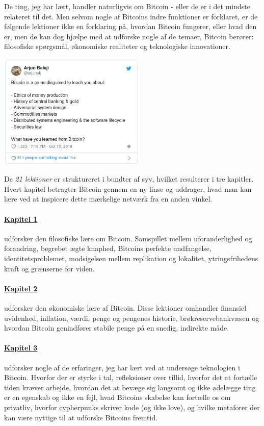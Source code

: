 \documentclass[paper=6in:9in,pagesize=pdftex,headinclude=on,footinclude=on,12pt]{scrbook}
\begin{document}
De ting, jeg har lært, handler naturligvis om Bitcoin - eller de er i det mindste relateret til det. Men selvom nogle af Bitcoins indre funktioner er forklaret, er de følgende lektioner ikke en forklaring på, hvordan Bitcoin fungerer, eller hvad den er, men de kan dog hjælpe med at udforske nogle af de temaer, Bitcoin berører: filosofiske spørgsmål, økonomiske realiteter og teknologiske innovationer.\begin{center}
  \includegraphics[width=7cm]{assets/images/the-tweet.png}
\end{center}

De \textit{21 lektioner} er struktureret i bundter af syv, hvilket resulterer i tre kapitler. Hvert kapitel betragter Bitcoin gennem en ny linse og uddrager, hvad man kan lære ved at inspicere dette mærkelige netværk fra en anden vinkel.\paragraph{\hyperref[ch:philosophy]{Kapitel 1}}{udforsker den filosofiske lære om Bitcoin. Samspillet mellem uforanderlighed og forandring, begrebet ægte knaphed, Bitcoins perfekte undfangelse, identitetsproblemet, modsigelsen mellem replikation og lokalitet, ytringsfrihedens kraft og grænserne for viden. }

\paragraph{\hyperref[ch:economics]{Kapitel 2}}{udforsker den økonomiske lære af Bitcoin. Disse lektioner omhandler finansiel uvidenhed, inflation, værdi, penge og pengenes historie, brøkreservebankvæsen og hvordan Bitcoin genindfører stabile penge på en snedig, indirekte måde.}

\paragraph{\hyperref[ch:technology]{Kapitel 3}}{udforsker nogle af de erfaringer, jeg har lært ved at undersøge teknologien i Bitcoin. Hvorfor der er styrke i tal, refleksioner over tillid, hvorfor det at fortælle tiden kræver arbejde, hvordan det at bevæge sig langsomt og ikke ødelægge ting er en egenskab og ikke en fejl, hvad Bitcoins skabelse kan fortælle os om privatliv, hvorfor cypherpunks skriver kode (og ikke love), og hvilke metaforer der kan være nyttige til at udforske Bitcoins fremtid.}
\end{document}
